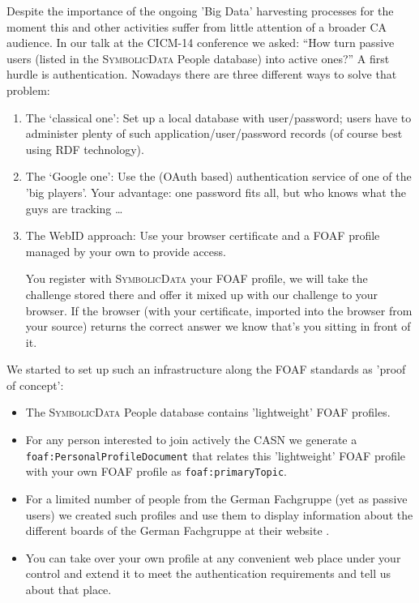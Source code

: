 \documentclass[a4paper,11pt]{article}
\def\SD{\textsc{SymbolicData}}
\begin{document}
\begin{multicols}{2}
Despite the importance of the ongoing 'Big Data' harvesting processes for the
moment this and other activities suffer from little attention of a broader CA
audience.  In our talk at the CICM-14 conference \cite{cicm-14} we asked: ``How
turn passive users (listed in the {\SD} People database) into active ones?'' A
first hurdle is authentication. Nowadays there are three different ways to
solve that problem:
\begin{enumerate}
\item The `classical one': Set up a local database with user/password; users
  have to administer plenty of such application/user/password records (of
  course best using RDF technology).
\item The `Google one': Use the (OAuth based) authentication service of one of
  the 'big players'.  Your advantage: one password fits all, but who knows
  what the guys are tracking {\ldots}
\item The WebID approach: Use your browser certificate and a FOAF profile
  managed by your own to provide access.  

  You register with {\SD} your FOAF profile, we will take the challenge stored
  there and offer it mixed up with our challenge to your browser. If the
  browser (with your certificate, imported into the browser from your source)
  returns the correct answer we know that's you sitting in front of it.
\end{enumerate}
We started to set up such an infrastructure along the FOAF standards
as 'proof of concept':
\begin{itemize}
\item The {\SD} People database contains 'lightweight' FOAF profiles.
\item For any person interested to join actively the CASN we generate
  a \texttt{foaf:Personal\-Profile\-Document} that relates this
  'lightweight' FOAF profile with your own FOAF profile as
  \texttt{foaf:primaryTopic}.
\item For a limited number of people from the German Fachgruppe (yet
  as passive users) we created such profiles and use them to display
  information about the different boards of the German Fachgruppe at
  their website \cite{cafg}.
\item You can take over your own profile at any convenient web place
  under your control and extend it to meet the authentication
  requirements and tell us about that place.


\end{itemize}
\end{multicols}
\end{document}
